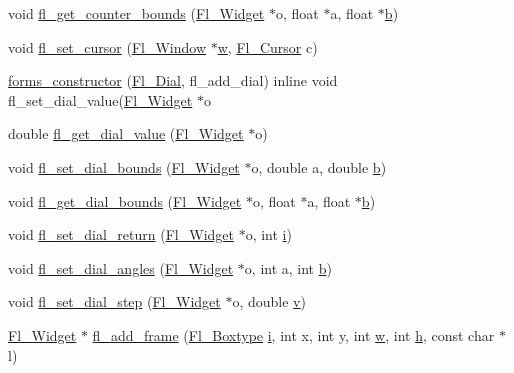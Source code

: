 \begin{DoxyCompactItemize}
void \hyperlink{forms_8_h_aa29fd5c0674a376b95cad3a561a3aa80}{fl\+\_\+get\+\_\+counter\+\_\+bounds} (\hyperlink{class_fl___widget}{Fl\+\_\+\+Widget} $\ast$o, float $\ast$a, float $\ast$\hyperlink{forms_8_h_a0ba06a290a384fa06b1b90745827dae2}{b})
\item 
void \hyperlink{forms_8_h_ab0a220cb79ec917a58acce6c2fa762a5}{fl\+\_\+set\+\_\+cursor} (\hyperlink{class_fl___window}{Fl\+\_\+\+Window} $\ast$\hyperlink{forms_8_h_aac374e320caaadeca4874add33b62af2}{w}, \hyperlink{_enumerations_8_h_a72bde974edc7926b1217dd51b8c7e8e0}{Fl\+\_\+\+Cursor} c)
\item 
\hyperlink{forms_8_h_a110fe4cb82fb9d8ae5cbc29bc6a49868}{forms\+\_\+constructor} (\hyperlink{class_fl___dial}{Fl\+\_\+\+Dial}, fl\+\_\+add\+\_\+dial) inline void fl\+\_\+set\+\_\+dial\+\_\+value(\hyperlink{class_fl___widget}{Fl\+\_\+\+Widget} $\ast$o
\item 
double \hyperlink{forms_8_h_a3c06394ddf5dd33fa5a66016fc4a4449}{fl\+\_\+get\+\_\+dial\+\_\+value} (\hyperlink{class_fl___widget}{Fl\+\_\+\+Widget} $\ast$o)
\item 
void \hyperlink{forms_8_h_a2c88aec07743563472dec8cd1918dee8}{fl\+\_\+set\+\_\+dial\+\_\+bounds} (\hyperlink{class_fl___widget}{Fl\+\_\+\+Widget} $\ast$o, double a, double \hyperlink{forms_8_h_a0ba06a290a384fa06b1b90745827dae2}{b})
\item 
void \hyperlink{forms_8_h_a63f17667d89bf660305c330592b11c32}{fl\+\_\+get\+\_\+dial\+\_\+bounds} (\hyperlink{class_fl___widget}{Fl\+\_\+\+Widget} $\ast$o, float $\ast$a, float $\ast$\hyperlink{forms_8_h_a0ba06a290a384fa06b1b90745827dae2}{b})
\item 
void \hyperlink{forms_8_h_ab21037c584974df27ce3d908d3b37dac}{fl\+\_\+set\+\_\+dial\+\_\+return} (\hyperlink{class_fl___widget}{Fl\+\_\+\+Widget} $\ast$o, int \hyperlink{forms_8_h_acb559820d9ca11295b4500f179ef6392}{i})
\item 
void \hyperlink{forms_8_h_aa0398dcc387465e1c775b54bb540c767}{fl\+\_\+set\+\_\+dial\+\_\+angles} (\hyperlink{class_fl___widget}{Fl\+\_\+\+Widget} $\ast$o, int a, int \hyperlink{forms_8_h_a0ba06a290a384fa06b1b90745827dae2}{b})
\item 
void \hyperlink{forms_8_h_a73a2e3d998bc93ba853cfe46d176d9b7}{fl\+\_\+set\+\_\+dial\+\_\+step} (\hyperlink{class_fl___widget}{Fl\+\_\+\+Widget} $\ast$o, double \hyperlink{forms_8_h_a3b90d5a73541ab9402511d87bed076ef}{v})
\item 
\hyperlink{class_fl___widget}{Fl\+\_\+\+Widget} $\ast$ \hyperlink{forms_8_h_ae23179107c7fe06cec999dfd544d6734}{fl\+\_\+add\+\_\+frame} (\hyperlink{_enumerations_8_h_ae48bf9070f8541de17829f54ccacc6bc}{Fl\+\_\+\+Boxtype} \hyperlink{forms_8_h_acb559820d9ca11295b4500f179ef6392}{i}, int x, int y, int \hyperlink{forms_8_h_aac374e320caaadeca4874add33b62af2}{w}, int \hyperlink{forms_8_h_a7e427ba5b307f9068129699250690066}{h}, const char $\ast$l)

\end{DoxyCompactItemize}
